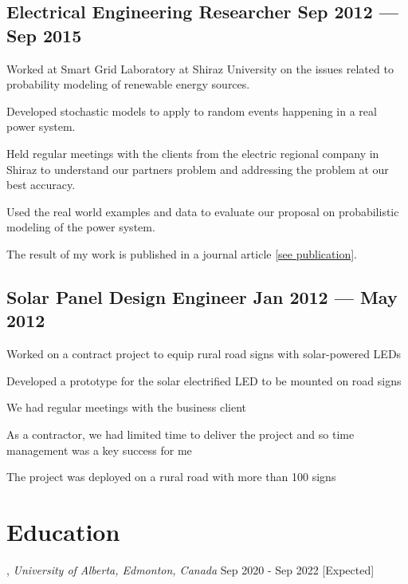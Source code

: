 \documentclass[letter,11pt]{article}
\begin{document}
\subsection{Electrical Engineering Researcher \hfill Sep 2012 --- Sep 2015}
\begin{zitemize}
	\item Worked at Smart Grid Laboratory at Shiraz University on the issues related to probability modeling of renewable energy sources.
	\item Developed stochastic models to apply to random events happening in a real power system.
	\item Held regular meetings with the clients from the electric regional company in Shiraz to understand our partners problem and addressing the problem at our best accuracy.
	\item Used the real world examples and data to evaluate our proposal on probabilistic modeling of the power system.
	\item The result of my work is published in a journal article [\href{https://ieeexplore.ieee.org/abstract/document/7434076}{see publication}].
\end{zitemize}


\subsection{Solar Panel Design Engineer \hfill Jan 2012 --- May 2012}
\begin{zitemize}
	\item Worked on a contract project to equip rural road signs with solar-powered LEDs
	\item Developed a prototype for the solar electrified LED to be mounted on road signs
	\item We had regular meetings with the business client
	\item As a contractor, we had limited time to deliver the project and so time management was a key success for me
	\item The project was deployed on a rural road with more than 100 signs
\end{zitemize}


\section{Education}
, \textit{University of Alberta, Edmonton, Canada}	\hfill Sep 2020 -  Sep 2022 [Expected]
\end{document}
